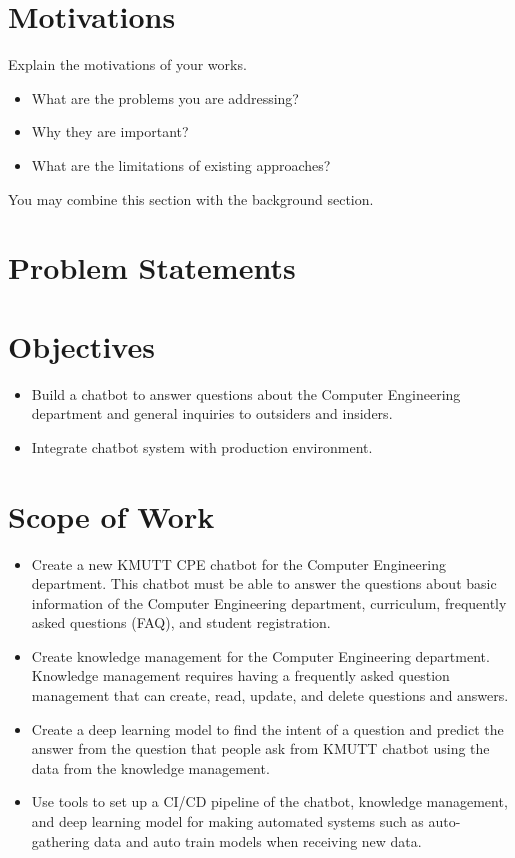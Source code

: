 \documentclass[12pt,oneside,openright,a4paper]{cpe-english-project}
\begin{document}
\section{Motivations}
Explain the motivations of your works.  
\begin{itemize}
\item   What are the problems you are addressing? 
\item  Why they are important?
\item  What are the limitations of existing approaches? 
\end{itemize}
You may combine this section with the background section.


\section{Problem Statements}

\section{Objectives}
\begin{itemize}
\item  Build a chatbot to answer questions about the Computer Engineering department and general inquiries to outsiders and insiders.
\item  Integrate chatbot system with production environment.
\end{itemize}

\section{Scope of Work}

\begin{itemize}
\item  Create a new KMUTT CPE chatbot for the Computer Engineering department. This chatbot must be able to answer the questions about basic information of the Computer Engineering department, curriculum, frequently asked questions (FAQ), and student registration.
\item  Create knowledge management for the Computer Engineering department. Knowledge management requires having a frequently asked question management that can create, read, update, and delete questions and answers.
\item  Create a deep learning model to find the intent of a question and predict the answer from the question that people ask from KMUTT chatbot using the data from the knowledge management.
\item  Use tools to set up a CI/CD pipeline of the chatbot, knowledge management, and deep learning model for making automated systems such as auto-gathering data and auto train models when receiving new data.
\end{itemize}
\end{document}
